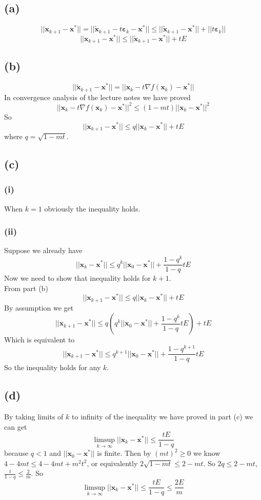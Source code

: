 \documentclass[12pt,letterpaper]{article}
\begin{document}
\section{}
\subsection*{(a)}
$$||\boldsymbol{x}_{k+1}-\boldsymbol{x}^*||=||\boldsymbol{\tilde{x}}_{k+1}-t\boldsymbol{\varepsilon}_k-\boldsymbol{x}^*||\leq||\boldsymbol{\tilde{x}}_{k+1}-\boldsymbol{x}^*||+||t\boldsymbol{\varepsilon}_k||$$
$$||\boldsymbol{x}_{k+1}-\boldsymbol{x}^*||\leq||\boldsymbol{\tilde{x}}_{k+1}-\boldsymbol{x}^*||+tE$$
\subsection*{(b)}
$$||\boldsymbol{\tilde{x}}_{k+1}-\boldsymbol{x}^*||=||\boldsymbol{{x}}_{k}-t\nabla f(\boldsymbol{x}_k)-\boldsymbol{x}^*||$$
In convergence analysis of the lecture notes we have proved 
$$||\boldsymbol{{x}}_{k}-t\nabla f(\boldsymbol{x}_k)-\boldsymbol{x}^*||^2\leq(1-mt)||\boldsymbol{{x}}_{k}-\boldsymbol{x}^*||^2$$
So
$$||\boldsymbol{x}_{k+1}-\boldsymbol{x}^*||\leq q||\boldsymbol{{x}}_{k}-\boldsymbol{x}^*||+tE$$
where $q=\sqrt{1-mt}$.
\subsection*{(c)}
\subsubsection*{(i)}
When $k=1$ obviously the inequality holds.
\subsubsection*{(ii)}
Suppose we already have $$||\boldsymbol{x}_k-\boldsymbol{x}^*||\leq q^k||\boldsymbol{x}_0-\boldsymbol{x}^*||+\frac{1-q^k}{1-q}tE$$
Now we need to show that inequality holds for $k+1$.\\
From part (b)
$$||\boldsymbol{x}_{k+1}-\boldsymbol{x}^*||\leq q||\boldsymbol{{x}}_{k}-\boldsymbol{x}^*||+tE$$
By assumption we get
$$||\boldsymbol{x}_{k+1}-\boldsymbol{x}^*||\leq q(q^k||\boldsymbol{x}_0-\boldsymbol{x}^*||+\frac{1-q^k}{1-q}tE)+tE$$
Which is equivalent to $$||\boldsymbol{x}_{k+1}-\boldsymbol{x}^*||\leq q^{k+1}||\boldsymbol{x}_0-\boldsymbol{x}^*||+\frac{1-q^{k+1}}{1-q}tE$$
So the inequality holds for any $k$.
\subsection*{(d)}
By taking limits of $k$ to infinity of the inequality we have proved in part (c) we can get $$\limsup_{k\to \infty}||\boldsymbol{x}_k-\boldsymbol{x}^*||\leq\frac{tE}{1-q}$$ because $q<1$ and $||\boldsymbol{x}_0-\boldsymbol{x}^*||$ is finite. Then by $(mt)^2\geq0$ we know $4-4mt\leq4-4mt+m^2t^2$, or equivalently $2\sqrt{1-mt}\leq2-mt$. So $2q\leq2-mt$, $\frac{t}{1-q}\leq\frac{2}{m}$. So 
$$\limsup_{k\to \infty}||\boldsymbol{x}_k-\boldsymbol{x}^*||\leq\frac{tE}{1-q}\leq\frac{2E}{m}$$
\end{document}
